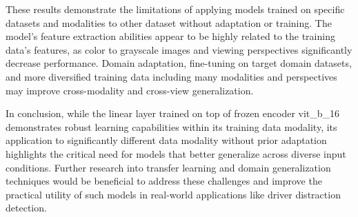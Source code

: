 These results demonstrate the limitations of applying models trained on specific datasets and modalities to other dataset without adaptation or training. The model's feature extraction abilities appear to be highly related to the training data's features, as color to grayscale images and viewing perspectives significantly decrease performance. Domain adaptation, fine-tuning on target domain datasets, and more diversified training data including many modalities and perspectives may improve cross-modality and cross-view generalization. 

In conclusion, while the linear layer trained on top of frozen encoder vit\_b\_16 demonstrates robust learning capabilities within its training data modality, its application to significantly different data modality without prior adaptation highlights the critical need for models that better generalize across diverse input conditions. Further research into transfer learning and domain generalization techniques would be beneficial to address these challenges and improve the practical utility of such models in real-world applications like driver distraction detection.

